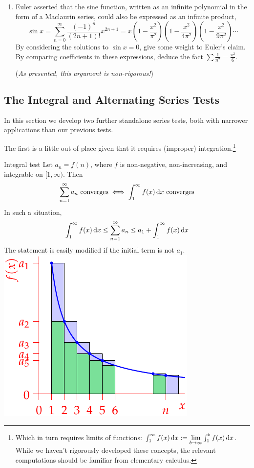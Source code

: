 \begin{exercises}{}{}
\begin{enumerate}
	  \item\label{exs:eulersum} Euler asserted that the sine function, written as an infinite polynomial in the form of a Maclaurin series, could also be expressed as an infinite product,
	  \[\sin x =\sum_{n=0}^\infty \frac{(-1)^n}{(2n+1)!}x^{2n+1} =x\left(1-\frac{x^2}{\pi^2}\right)\left(1-\frac{x^2}{4\pi^2}\right)\left(1-\frac{x^2}{9\pi^2}\right)\cdots \]
	  By considering the solutions to $\sin x=0$, give some weight to Euler's claim. By comparing coefficients in these expressions, deduce the fact $\sum \frac 1{n^2}=\frac{\pi^2}6$.\par
	  (\emph{As presented, this argument is non-rigorous!})
	\end{enumerate}
\end{exercises}


\clearpage


\subsection{The Integral and Alternating Series Tests}

In this section we develop two further standalone series tests, both with narrower applications than our previous tests.\smallbreak

The first is a little out of place given that it requires (improper) integration.\footnote{%
	Which in turn requires limits of functions: $\int_1^\infty f(x)\,{\mathrm{d} x}:=\lim\limits_{b\to\infty}\int_1^bf(x)\,{\mathrm{d} x}$. While we haven't rigorously developed these concepts, the relevant computations should be familiar from elementary calculus.%
} 

\begin{thm}[lower separated=false, sidebyside, sidebyside align=top seam, sidebyside gap=0pt, righthand width=0.4\linewidth]{Integral test}{}
	Let $a_n=f(n)$, where $f$ is non-negative, non-increasing, and integrable on $[1,\infty)$. Then
	\[
		\sum_{n=1}^\infty a_n\ \text{converges} \iff \int_1^\infty f(x)\,\dx\ \text{converges}
	\]
	In such a situation,
	\[
		\int_1^\infty f(x)\,{\mathrm{d} x}\le\sum_{n=1}^\infty a_n\le a_1+\int_1^\infty f(x)\,{\mathrm{d} x}
	\]
	The statement is easily modified if the initial term is not $a_1$.
	\tcblower
	\flushright\includegraphics[scale=0.95]{integraltest}
\end{thm}

